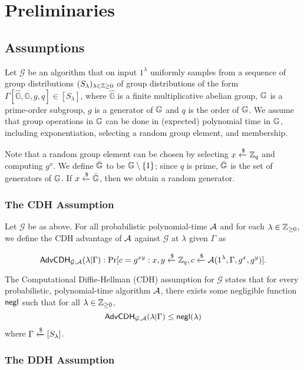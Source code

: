 \section{Preliminaries}

\subsection{Assumptions}

Let $\mathcal{G}$ be an algorithm that on input $1^\lambda$ uniformly samples from a sequence of group distributions $(S_\lambda)_{\lambda\in\mathbb{Z}\geq 0}$ of group distributions of the form $\Gamma[\hat{\mathbb{G}}, \mathbb{G}, g, q]\in[S_\lambda]$, where $\hat{\mathbb{G}}$ is a finite multiplicative abelian group, $\mathbb{G}$ is a prime-order subgroup, $g$ is a generator of $\mathbb{G}$ and $q$ is the order of $\mathbb{G}$. We assume that group operations in $\mathbb{G}$ can be done in (expected) polynomial time in $\mathbb{G}$, including exponentiation, selecting a random group element, and membership. 

Note that a random group element can be chosen by selecting $x\xleftarrow{\$}\mathbb{Z}_q$ and computing $g^x$. We define $\bar{\mathbb{G}}$ to be $\mathbb{G}\setminus\{1\}$; since $q$ is prime, $\bar{\mathbb{G}}$ is the set of generators of $\mathbb{G}$. If $x\xleftarrow{\$}\bar{\mathbb{G}}$, then we obtain a random generator.

\subsubsection{The CDH Assumption}

Let $\mathcal{G}$ be as above. For all probabilistic polynomial-time $\mathcal{A}$ and for each $\lambda\in\mathbb{Z}_{\geq 0}$, we define the CDH advantage of $\mathcal{A}$ against $\mathcal{G}$ at $\lambda$ given $\Gamma$ as

$$\mathsf{AdvCDH}_{\mathcal{G},\mathcal{A}}(\lambda | \Gamma):\Pr[c=g^{xy}: x, y\xleftarrow{\$} \mathbb{Z}_q, c\xleftarrow{\$}\mathcal{A}(1^\lambda,\Gamma,g^x,g^y)].$$

The Computational Diffie-Hellman (CDH) assumption for $\mathcal{G}$ states that for every probabilistic, polynomial-time algorithm $\mathcal{A}$, there exists some negligible function $\mathsf{negl}$ such that for all $\lambda\in\mathbb{Z}_{\geq 0}$, $$\mathsf{AdvCDH}_{\mathcal{G},\mathcal{A}}(\lambda | \Gamma)\leq\mathsf{negl}(\lambda)$$ where $\Gamma\xleftarrow{\$}[S_\lambda]$.

\subsubsection{The DDH Assumption}

